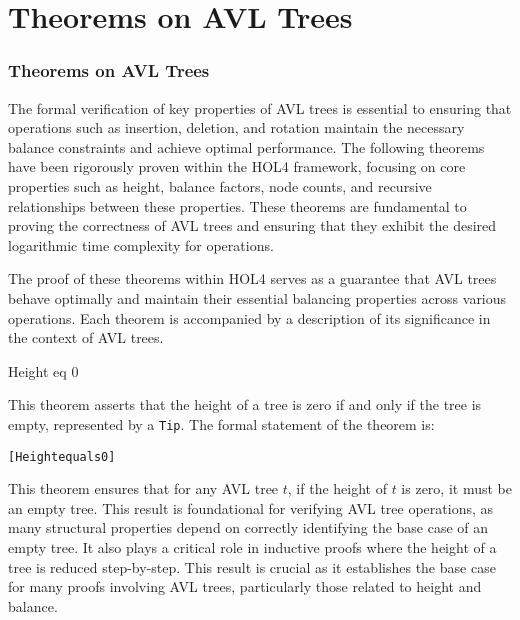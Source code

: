 \chapter{Theorems on AVL Trees}\label{chap:content}


\subsection{Theorems on AVL Trees}

The formal verification of key properties of AVL trees is essential to ensuring that operations such as insertion, deletion, and rotation maintain the necessary balance constraints and achieve optimal performance. The following theorems have been rigorously proven within the HOL4 framework, focusing on core properties such as height, balance factors, node counts, and recursive relationships between these properties. These theorems are fundamental to proving the correctness of AVL trees and ensuring that they exhibit the desired logarithmic time complexity for operations.

The proof of these theorems within HOL4 serves as a guarantee that AVL trees behave optimally and maintain their essential balancing properties across various operations. Each theorem is accompanied by a description of its significance in the context of AVL trees.

	
	\begin{thm}{Height eq 0}

    This theorem asserts that the height of a tree is zero if and only if the tree is empty, represented by a \texttt{Tip}. The formal statement of the theorem is:

    \begin{alltt}
    	[Height equals 0]
    \end{alltt}
    
    
    \end{thm}

    This theorem ensures that for any AVL tree \(t\), if the height of \(t\) is zero, it must be an empty tree. This result is foundational for verifying AVL tree operations, as many structural properties depend on correctly identifying the base case of an empty tree. It also plays a critical role in inductive proofs where the height of a tree is reduced step-by-step. This result is crucial as it establishes the base case for many proofs involving AVL trees, particularly those related to height and balance.

